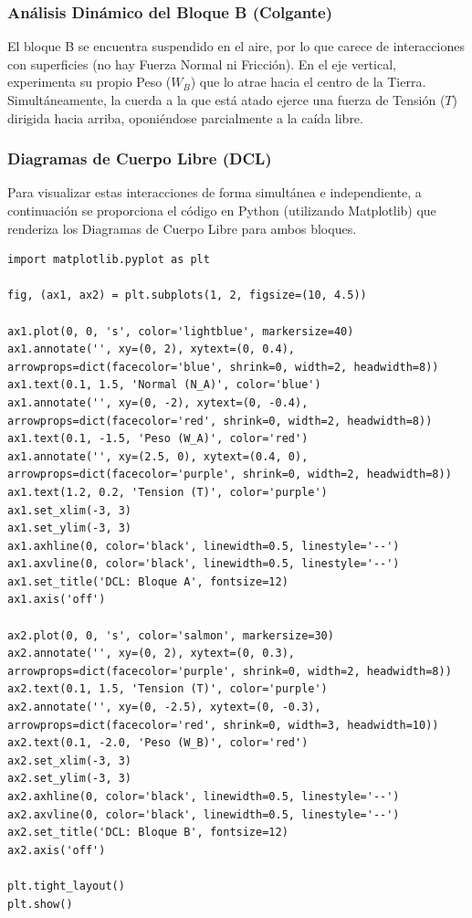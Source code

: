 \documentclass[12pt]{article}
\begin{document}
\subsubsection*{Análisis Dinámico del Bloque B (Colgante)}
El bloque B se encuentra suspendido en el aire, por lo que carece de interacciones con superficies (no hay Fuerza Normal ni Fricción). En el eje vertical, experimenta su propio Peso ($W_B$) que lo atrae hacia el centro de la Tierra. Simultáneamente, la cuerda a la que está atado ejerce una fuerza de Tensión ($T$) dirigida hacia arriba, oponiéndose parcialmente a la caída libre.

\subsubsection*{Diagramas de Cuerpo Libre (DCL)}
Para visualizar estas interacciones de forma simultánea e independiente, a continuación se proporciona el código en Python (utilizando Matplotlib) que renderiza los Diagramas de Cuerpo Libre para ambos bloques.

\begin{lstlisting}
import matplotlib.pyplot as plt

fig, (ax1, ax2) = plt.subplots(1, 2, figsize=(10, 4.5))

ax1.plot(0, 0, 's', color='lightblue', markersize=40)
ax1.annotate('', xy=(0, 2), xytext=(0, 0.4), arrowprops=dict(facecolor='blue', shrink=0, width=2, headwidth=8))
ax1.text(0.1, 1.5, 'Normal (N_A)', color='blue')
ax1.annotate('', xy=(0, -2), xytext=(0, -0.4), arrowprops=dict(facecolor='red', shrink=0, width=2, headwidth=8))
ax1.text(0.1, -1.5, 'Peso (W_A)', color='red')
ax1.annotate('', xy=(2.5, 0), xytext=(0.4, 0), arrowprops=dict(facecolor='purple', shrink=0, width=2, headwidth=8))
ax1.text(1.2, 0.2, 'Tension (T)', color='purple')
ax1.set_xlim(-3, 3)
ax1.set_ylim(-3, 3)
ax1.axhline(0, color='black', linewidth=0.5, linestyle='--')
ax1.axvline(0, color='black', linewidth=0.5, linestyle='--')
ax1.set_title('DCL: Bloque A', fontsize=12)
ax1.axis('off')

ax2.plot(0, 0, 's', color='salmon', markersize=30)
ax2.annotate('', xy=(0, 2), xytext=(0, 0.3), arrowprops=dict(facecolor='purple', shrink=0, width=2, headwidth=8))
ax2.text(0.1, 1.5, 'Tension (T)', color='purple')
ax2.annotate('', xy=(0, -2.5), xytext=(0, -0.3), arrowprops=dict(facecolor='red', shrink=0, width=3, headwidth=10))
ax2.text(0.1, -2.0, 'Peso (W_B)', color='red')
ax2.set_xlim(-3, 3)
ax2.set_ylim(-3, 3)
ax2.axhline(0, color='black', linewidth=0.5, linestyle='--')
ax2.axvline(0, color='black', linewidth=0.5, linestyle='--')
ax2.set_title('DCL: Bloque B', fontsize=12)
ax2.axis('off')

plt.tight_layout()
plt.show()
\end{lstlisting}
\end{document}
